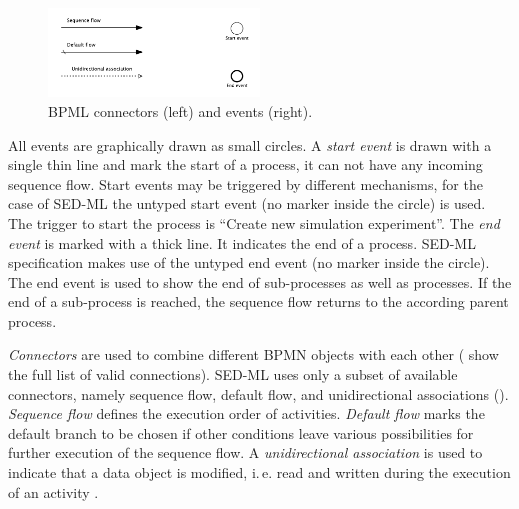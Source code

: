 \begin{figure}[h]
\centering
\includegraphics[width=0.5\textwidth]{images/connectors.pdf}
\caption{BPML connectors (left) and events (right).}
\label{fig:connectorEvents}
\end{figure}

All events are graphically drawn as small circles. A \emph{start event} is drawn with a single thin line and mark the start of a process, it can not have any incoming sequence flow. Start events may be triggered by different mechanisms, for the case of SED-ML the untyped start event (no marker inside the circle) is used. The trigger to start the process is ``Create new simulation experiment''. The \emph{end event} is marked with a thick line. It indicates the end of a process. SED-ML specification makes use of the untyped end event (no marker inside the circle). The end event is used to show the end of sub-processes as well as processes. If the end of a sub-process is reached, the sequence flow returns to the according parent process.

\emph{Connectors} are used to combine different BPMN objects with each other (\citet[p.~30]{White:2004} show the full list of valid connections). SED-ML uses only a subset of available connectors, namely sequence flow, default flow, and unidirectional associations (). \emph{Sequence flow} defines the execution order of activities. \emph{Default flow} marks the default branch to be chosen if other conditions leave various possibilities for further execution of the sequence flow. A \emph{unidirectional association} is used to indicate that a data object is modified, i.\,e. read and written during the execution of an activity \citep{bpmnPoster}.

